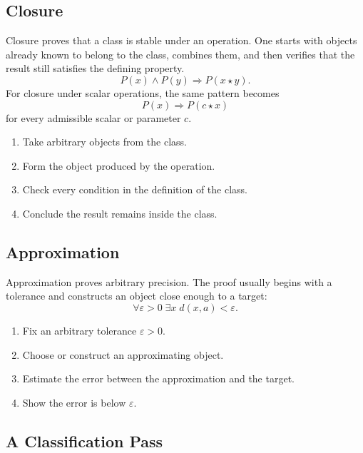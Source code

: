 \subsection*{Closure}
\label{subsec:property-closure}

Closure proves that a class is stable under an operation. One starts with
objects already known to belong to the class, combines them, and then verifies
that the result still satisfies the defining property.
\[
  P(x)\land P(y)\Longrightarrow P(x\star y).
\]
For closure under scalar operations, the same pattern becomes
\[
  P(x)\Longrightarrow P(c\star x)
\]
for every admissible scalar or parameter $c$.

\begin{remark}
\begin{enumerate}
  \item Take arbitrary objects from the class.
  \item Form the object produced by the operation.
  \item Check every condition in the definition of the class.
  \item Conclude the result remains inside the class.
\end{enumerate}
\end{remark}

\subsection*{Approximation}
\label{subsec:property-approximation}

Approximation proves arbitrary precision. The proof usually begins with a
tolerance and constructs an object close enough to a target:
\[
  \forall\varepsilon>0\;\exists x\;d(x,a)<\varepsilon.
\]

\begin{remark}
\begin{enumerate}
  \item Fix an arbitrary tolerance $\varepsilon>0$.
  \item Choose or construct an approximating object.
  \item Estimate the error between the approximation and the target.
  \item Show the error is below $\varepsilon$.
\end{enumerate}
\end{remark}

\subsection*{A Classification Pass}
\label{subsec:property-classification-pass}

